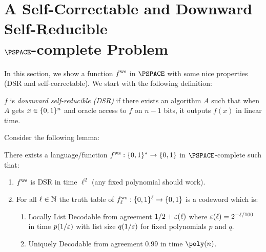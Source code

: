 \section[A Self-Correctable and Downward Self-Reducible \texorpdfstring{$\PSPACE$}{PSPACE}-complete Problem]
{A Self-Correctable and Downward Self-Reducible \\ \texorpdfstring{$\PSPACE$}{PSPACE}-complete Problem}

In this section, we show a function $ f^{\text{ws}} $ in $\PSPACE$ with some nice properties (DSR and self-correctable). We start with the following definition:
\begin{definition}
	$f$ is \emph{downward self-reducible (DSR)} if there exists an algorithm $A$
	such that when $A$ gets $x \in \{0, 1\}^n$ and oracle access to $f$ on $n -
	1$ bits, it outputs $f(x)$ in linear time.
\end{definition}

Consider the following lemma:
\begin{lemma}\label{lem:DSR-ECC-func}
	There exists a language/function $ f^{\text{ws}}  :\{0,1\}^* \rightarrow \{0,1\}$ in $\PSPACE$-complete such that:
	\begin{enumerate}
		\item $ f^{\text{ws}} $ is DSR in time ${\ell}^2$ (any fixed polynomial should work).
		\item For all $\ell \in \mathbb{N}$ the truth table of $ f^{\text{ws}} _{\ell} : \{0,1\}^\ell \rightarrow \{0,1\}$ is a codeword
		which is:
		\begin{enumerate}
			\item Locally List Decodable from agreement $1/2 + \varepsilon(\ell)$ where $\varepsilon(\ell) = 2^{-\ell /
				100}$ in time $p(1/\varepsilon)$ with list size $q(1 / \varepsilon)$ for fixed polynomials $p$ and $q$.
			\item Uniquely Decodable from agreement $0.99$ in time $\poly(n)$.
		\end{enumerate}
	\end{enumerate}
\end{lemma}


